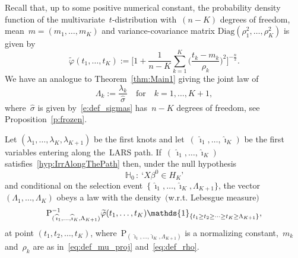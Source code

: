 \documentclass[final,numbib]{imaiai}%
\numberwithin{equation}{section}
\def\eq{\begin{equation}}
\def\qe{\end{equation}}
\renewcommand{\hat}{\widehat}
\renewcommand{\tilde}{\widetilde}
\newcommand{\<}{\langle}
\renewcommand{\>}{\rangle}
\newcommand{\1}{\mathds{1}}
\begin{document}
{\noindent
Recall that, up to some positive numerical constant, the probability density function of the multivariate~$t$-distribution with~$(n-K)$ degrees of freedom, mean~$m=(m_1,\ldots,m_K)$ and variance-covariance matrix $\mathrm{Diag}(\rho_1^2,\ldots,\rho_K^2)$ is given by
\[
\tilde\varphi(t_1,\ldots,t_K):=
\Bigg[1+\frac1{n-K}{\sum_{k=1}^K \Big(\frac{t_k-m_k}{\rho_k}\Big)^2}\Bigg]^{-\frac{n}2}.
\]
We have an analogue to Theorem~\ref{thm:Main1} giving the joint law of 
\eq
\label{def_Lambda}
\Lambda_k:=\frac{\lambda_{k}}{\hat\sigma}\quad\text{for}\quad k=1,\ldots, K+1,
\qe
where~$\hat\sigma$ is given by~\eqref{e:def_sigmas} has~$n-K$ degrees of freedom, see Proposition~\ref{p:frozen}. 

\begin{theorem}
\label{thm:Main2}
Let $(\lambda_1,\ldots, \lambda_K,\lambda_{K+1})$ be the first knots and let~$(\,\hat \imath_1,\ldots, \hat \imath_K)$ be the first variables entering along the~LARS path. If~$(\,\hat \imath_1,\ldots, \hat \imath_K)$ satisfies~\eqref{hyp:IrrAlongThePath} then, under the null hypothesis
\[
\mathds H_0\,:\ \text{`}X\beta^0\in H_{K}\text{'}
\] 
and conditional on the selection event~$\{\,\hat \imath_1,\ldots, \hat \imath_K,\Lambda_{K+1}\}$, the vector~$(\Lambda_{1},\ldots,\Lambda_K)$ obeys a law with the density~$($w.r.t. Lebesgue measure$)$ 
\eq
\notag
{\mathrm P}^{-1}_{(\,\hat \imath_1,\ldots,\hat \imath_K,\Lambda_{K+1})}
\tilde\varphi(t_1,\ldots,t_K)
\mathds{1}_{\{t_1\geq t_{2}\geq\cdots\geq t_{K}\geq\Lambda_{K+1}\}},
\qe
{at point }$(t_1, t_{2},\ldots,t_{K})$, where~${\mathrm P}_{(\,\hat \imath_1,\ldots,\hat \imath_K,\Lambda_{K+1})}$ is a normalizing constant,~$m_k$ and~$\rho_k$ are as in~\eqref{eq:def_mu_proj} and~\eqref{eq:def_rho}.
\end{theorem}

}
\end{document}
